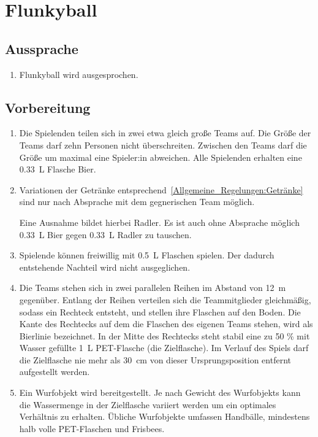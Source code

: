 \chapter{Flunkyball}
\section{Aussprache}
\begin{enumerate}[label={(\arabic*)}]
    \item
    Flunkyball wird  ausgesprochen.
\end{enumerate}

\section{Vorbereitung}
\begin{enumerate}[label={(\arabic*)}]
    \item
    Die Spielenden teilen sich in zwei etwa gleich große Teams auf.
    Die Größe der Teams darf zehn Personen nicht überschreiten.
    Zwischen den Teams darf die Größe um maximal eine Spieler:in abweichen.
    Alle Spielenden erhalten eine \SI{0,33}{\liter} Flasche Bier.

    \item Variationen der Getränke entsprechend~\ref{Allgemeine_Regelungen:Getränke} sind nur nach Absprache mit dem gegnerischen Team möglich.

    Eine Ausnahme bildet hierbei Radler.
    Es ist auch ohne Absprache möglich \SI{0,33}{\liter} Bier gegen \SI{0,33}{\liter} Radler zu tauschen.

    \item
    Spielende können freiwillig mit \SI{0,5}{\liter} Flaschen spielen.
    Der dadurch entstehende Nachteil wird nicht ausgeglichen.

    \item
    Die Teams stehen sich in zwei parallelen Reihen im Abstand von \SI{12}{\meter} gegenüber.
    Entlang der Reihen verteilen sich die Teammitglieder gleichmäßig, sodass ein Rechteck entsteht, und stellen ihre Flaschen auf den Boden.
    Die Kante des Rechtecks auf dem die Flaschen des eigenen Teams stehen, wird als \glqq{}Bierlinie\grqq{} bezeichnet.
    In der Mitte des Rechtecks steht stabil eine zu 50 \% mit Wasser gefüllte \SI{1}{\liter} PET-Flasche (die \glqq{}Zielflasche\grqq{}).
    Im Verlauf des Spiels darf die Zielflasche nie mehr als \SI{30}{\centi\meter} von dieser Ursprungsposition entfernt aufgestellt werden.

    \item
    Ein Wurfobjekt wird bereitgestellt.
    Je nach Gewicht des Wurfobjekts kann die Wassermenge in der Zielflasche variiert werden um ein optimales Verhältnis zu erhalten.
    Übliche Wurfobjekte umfassen Handbälle, mindestens halb volle PET-Flaschen und Frisbees.
\end{enumerate}

